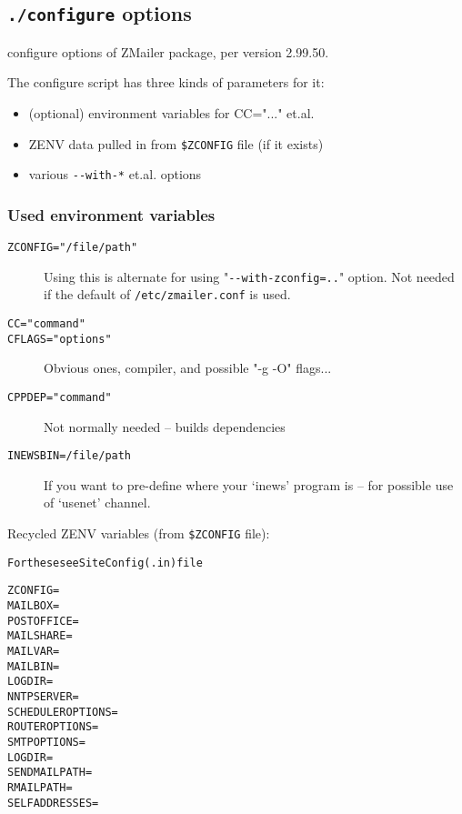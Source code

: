 \begin{multicols}{2}
\subsection{{\tt ./configure} options}%
%
%
\label{configure_options_list}

configure  options of ZMailer package, per version 2.99.50.


The  configure  script has three kinds of parameters for it:
\begin{itemize}
\item (optional) environment variables for CC="..." et.al.
\item ZENV data pulled in from {\tt \$ZCONFIG} file (if it exists)
\item various  \verb/--with-*/  et.al. options
\end{itemize}


\subsubsection{Used environment variables}

\begin{description}
\item[\tt ZCONFIG="/file/path"] \mbox{}

Using this is alternate for using "\verb/--with-zconfig=../" option.
Not needed if the default of {\tt /etc/zmailer.conf} is used.

\item[\tt CC="command"]
\item[\tt CFLAGS="options"] \mbox{}

Obvious ones, compiler, and possible "-g -O" flags...

\item[\tt CPPDEP="command"] \mbox{}

Not normally needed -- builds dependencies

\item[\tt INEWSBIN=/file/path] \mbox{}

If you want to pre-define where your `inews' program
is -- for possible use of `usenet' channel.
\end{description}

Recycled ZENV variables (from {\tt \$ZCONFIG} file):
\begin{alltt}\medskip
  For these see  SiteConfig(.in)  file

  ZCONFIG=
  MAILBOX=
  POSTOFFICE=
  MAILSHARE=
  MAILVAR=
  MAILBIN=
  LOGDIR=
  NNTPSERVER=
  SCHEDULEROPTIONS=
  ROUTEROPTIONS=
  SMTPOPTIONS=
  LOGDIR=
  SENDMAILPATH=
  RMAILPATH=
  SELFADDRESSES=
\end{alltt}


\end{multicols}
